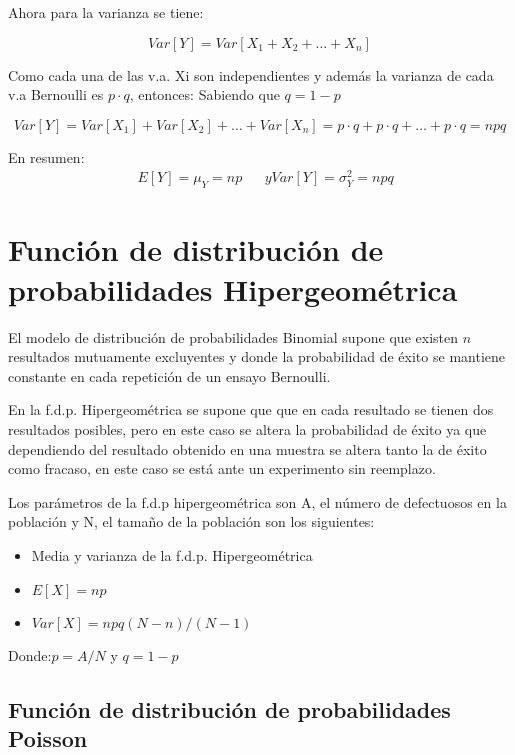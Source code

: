 Ahora para la varianza se tiene:

\begin{equation}
    Var[ Y ]=Var [ X_1+X_2+\dots+X_n ]
\end{equation}

Como cada una de las v.a. Xi son independientes y además la varianza de cada v.a
Bernoulli es $p\cdot q$, entonces:
Sabiendo que $q=1-p$

\begin{equation}
    Var[ Y ]=Var [ X_1 ]+Var [ X_2]+\dots +Var [ X_n] =p\cdot q+p\cdot q+\dots+p\cdot q=npq
\end{equation}

En resumen:
\begin{align*}
     & E[ Y ]=\mu_Y =np &  & y Var[ Y ]=\sigma_Y^2=npq
\end{align*}

\section{Función de distribución de probabilidades Hipergeométrica}


El modelo de distribución de probabilidades
Binomial supone que existen $n$ resultados
mutuamente excluyentes y donde la probabilidad
de éxito se mantiene constante en cada repetición
de un ensayo Bernoulli.

En la f.d.p. Hipergeométrica se supone que que en
cada resultado se tienen dos resultados posibles,
pero en este caso se altera la probabilidad de
éxito ya que dependiendo del resultado obtenido
en una muestra se altera tanto la de éxito como
fracaso, en este caso se está ante un experimento
sin reemplazo.

Los parámetros de la f.d.p hipergeométrica son
A, el número de defectuosos en la población y N,
el tamaño de la población son los siguientes:

\begin{itemize}
    \item Media y varianza de la f.d.p. Hipergeométrica
    \item $E[X]=np$
    \item $Var[X]=npq(N-n)/(N-1)$
\end{itemize}
Donde:$p=A/N$ y $q=1-p$


\subsection{Función de distribución de
    probabilidades Poisson}

